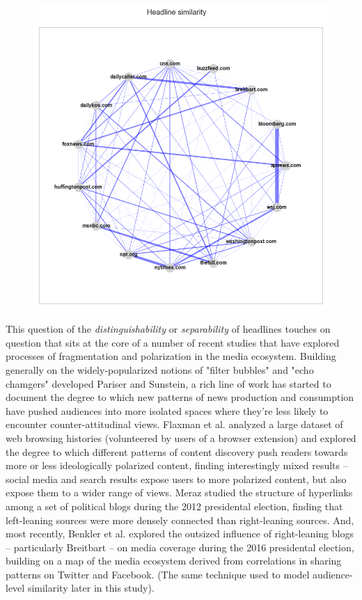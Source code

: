 \documentclass{scrartcl}
\begin{document}
\begin{figure}[H]
  \centering
  \includegraphics[height=0.5\textheight]{figures/hl-graph-radial-all-metrics.png}
\end{figure}

This question of the \textit{distinguishability} or \textit{separability} of headlines touches on question that sits at the core of a number of recent studies that have explored processes of fragmentation and polarization in the media ecosystem. Building generally on the widely-popularized notions of "filter bubbles" and "echo chamgers" developed Pariser\cite{pariser2011filter} and Sunstein,\cite{sunstein2003republic} a rich line of work has started to document the degree to which new patterns of news production and consumption have pushed audiences into more isolated spaces where they're less likely to encounter counter-attitudinal views. Flaxman et al. analyzed a large dataset of web browsing histories (volunteered by users of a browser extension) and explored the degree to which different patterns of content discovery push readers towards more or less ideologically polarized content, finding interestingly mixed results -- social media and search results expose users to more polarized content, but also expose them to a wider range of views.\cite{flaxman2016filter} Meraz studied the structure of hyperlinks among a set of political blogs during the 2012 presidental election, finding that left-leaning sources were more densely connected than right-leaning sources.\cite{meraz2015quantifying} And, most recently, Benkler et al. explored the outsized influence of right-leaning blogs -- particularly Breitbart -- on media coverage during the 2016 presidental election, building on a map of the media ecosystem derived from correlations in sharing patterns on Twitter and Facebook.\cite{benkler2017study} (The same technique used to model audience-level similarity later in this study).
\end{document}
